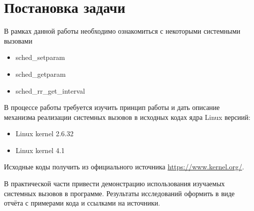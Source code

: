 \newpage
\section*{Постановка задачи}

\vspace{2em}

В рамках данной работы необходимо ознакомиться с некоторыми системными вызовами
\begin{itemize}
\item sched\_setparam
\item sched\_getparam
\item sched\_rr\_get\_interval
\end{itemize}

\vspace{1em}

В процессе работы требуется изучить принцип работы и дать описание механизма реализации системных вызовов в исходных кодах ядра Linux версиий:

\begin{itemize}
\item Linux kernel 2.6.32
\item Linux kernel 4.1
\end{itemize}

Исходные коды получить из официального источника \url{https://www.kernel.org/}.

\vspace{2em}

В практической части привести демонстрацию использования изучаемых системных вызовов в программе. Результаты исследований оформить в виде отчёта с примерами кода и ссылками на источники.
